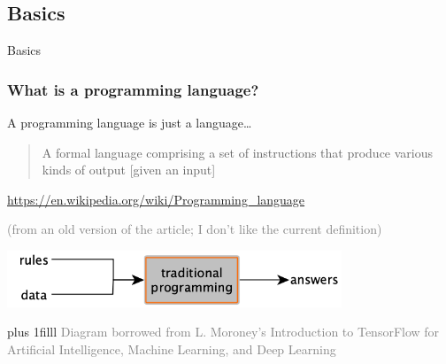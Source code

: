 \documentclass[xcolor=x11names]{beamer}
\newcommand{\light}[1]{\textcolor{gray}{#1}}
\newcommand{\btVFill}{\vskip0pt plus 1filll}
\begin{document}
\begin{frame}
\section{Basics}
\centering
\alert{Basics}
\end{frame}


\begin{frame}
\frametitle{What is a programming language?}

A programming language is \alert{just a language}\ldots
\medskip 					\pause 

\begin{quote}
A formal language comprising a set of \alert{instructions} that produce 
various kinds of \alert{output} [given an input]
\end{quote}
\begin{flushright}
\footnotesize
 \light{\url{https://en.wikipedia.org/wiki/Programming_language}}
 
 \light{(from an old version of the article; I don't like the current 
definition)}
\end{flushright}			\pause 

\bigskip 
\begin{center}
\includegraphics[width=100mm]{img/coli2020_diagrams_traditional_programming.png}
\end{center}

\btVFill
\footnotesize
\light{Diagram borrowed from L. Moroney's Introduction to TensorFlow for 
Artificial Intelligence, Machine Learning, and Deep Learning}

\end{frame}
\end{document}
